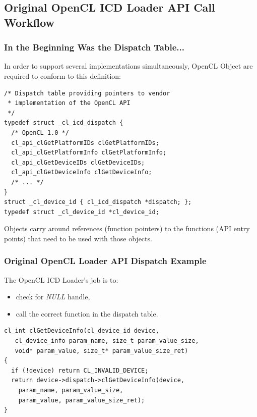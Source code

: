 \documentclass{beamer}
\begin{document}
\subsection[API Call]{Original OpenCL ICD Loader API Call Workflow}


\begin{frame}[fragile]
  \frametitle{In the Beginning Was the Dispatch Table...}
  In order to support several implementations simultaneously, OpenCL Object are
  required to conform to this definition:
  \tiny
  \begin{verbatim}
/* Dispatch table providing pointers to vendor
 * implementation of the OpenCL API
 */
typedef struct _cl_icd_dispatch {
  /* OpenCL 1.0 */
  cl_api_clGetPlatformIDs clGetPlatformIDs;
  cl_api_clGetPlatformInfo clGetPlatformInfo;
  cl_api_clGetDeviceIDs clGetDeviceIDs;
  cl_api_clGetDeviceInfo clGetDeviceInfo;
  /* ... */
}
struct _cl_device_id { cl_icd_dispatch *dispatch; };
typedef struct _cl_device_id *cl_device_id;
\end{verbatim}
  \normalsize
  Objects carry around references (function pointers) to the functions (API
  entry points) that need to be used with those objects.
\end{frame}

\begin{frame}[fragile]
  \frametitle{Original OpenCL Loader API Dispatch Example}
  The OpenCL ICD Loader's job is to:
  \begin{itemize}
    \item check for \textit{NULL} handle,
    \item call the correct function in the dispatch table.
  \end{itemize}
  \tiny
  \begin{verbatim}
cl_int clGetDeviceInfo(cl_device_id device,
   cl_device_info param_name, size_t param_value_size,
   void* param_value, size_t* param_value_size_ret)
{
  if (!device) return CL_INVALID_DEVICE;
  return device->dispatch->clGetDeviceInfo(device,
    param_name, param_value_size,
    param_value, param_value_size_ret);
}
\end{verbatim}
\end{frame}
\end{document}
